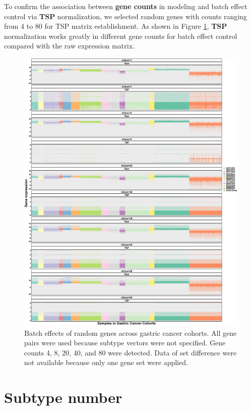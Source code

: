 \documentclass[
  12pt,
]{book}
\begin{document}
To confirm the association between \textbf{gene counts} in modeling and batch effect control via \textbf{TSP} normalization, we selected random genes with counts ranging from 4 to 80 for TSP matrix establishment. As shown in Figure \ref{fig:be02}, \textbf{TSP} normalization works greatly in different gene counts for batch effect control compared with the raw expression matrix.

\begin{figure}

{\centering \includegraphics[width=0.9\linewidth]{./fig/bactch-effect-02} 

}

\caption{Batch effects of random genes across gastric cancer cohorts.  All gene pairs were used because subtype vectors were not specified. Gene counts 4, 8, 20, 40, and 80 were detected. Data of set difference were not available because only one gene set were applied.}\label{fig:be02}
\end{figure}

\hypertarget{subtype-number}{%
\section{Subtype number}\label{subtype-number}}
\end{document}
